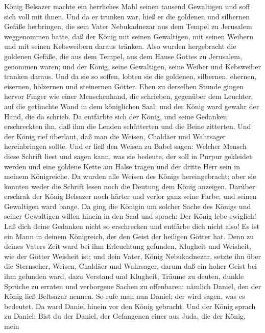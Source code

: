  König Belsazer machte ein herrliches Mahl seinen tausend
Gewaltigen und soff sich voll mit ihnen.  Und da er trunken
war, hieß er die goldenen und silbernen Gefäße herbringen, die sein
Vater Nebukadnezar aus dem Tempel zu Jerusalem weggenommen hatte, daß
der König mit seinen Gewaltigen, mit seinen Weibern und mit seinen
Kebsweibern daraus tränken.  Also wurden hergebracht die
goldenen Gefäße, die aus dem Tempel, aus dem Hause Gottes zu Jerusalem,
genommen waren; und der König, seine Gewaltigen, seine Weiber und
Kebsweiber tranken daraus.  Und da sie so soffen, lobten sie
die goldenen, silbernen, ehernen, eisernen, hölzernen und steinernen
Götter.  Eben zu derselben Stunde gingen hervor Finger wie
einer Menschenhand, die schrieben, gegenüber dem Leuchter, auf die
getünchte Wand in dem königlichen Saal; und der König ward gewahr der
Hand, die da schrieb.  Da entfärbte sich der König, und
seine Gedanken erschreckten ihn, daß ihm die Lenden schütterten und die
Beine zitterten.  Und der König rief überlaut, daß man die
Weisen, Chaldäer und Wahrsager hereinbringen sollte. Und er ließ den
Weisen zu Babel sagen: Welcher Mensch diese Schrift liest und sagen
kann, was sie bedeute, der soll in Purpur gekleidet werden und eine
goldene Kette am Halse tragen und der dritte Herr sein in meinem
Königreiche.  Da wurden alle Weisen des Königs
hereingebracht; aber sie konnten weder die Schrift lesen noch die
Deutung dem König anzeigen.  Darüber erschrak der König
Belsazer noch härter und verlor ganz seine Farbe; und seinen Gewaltigen
ward bange.  Da ging die Königin um solcher Sache des
Königs und seiner Gewaltigen willen hinein in den Saal und sprach: Der
König lebe ewiglich! Laß dich deine Gedanken nicht so erschrecken und
entfärbe dich nicht also!  Es ist ein Mann in deinem
Königreich, der den Geist der heiligen Götter hat. Denn zu deines Vaters
Zeit ward bei ihm Erleuchtung gefunden, Klugheit und Weisheit, wie der
Götter Weisheit ist; und dein Vater, König Nebukadnezar, setzte ihn über
die Sternseher, Weisen, Chaldäer und Wahrsager,  darum daß
ein hoher Geist bei ihm gefunden ward, dazu Verstand und Klugheit,
Träume zu deuten, dunkle Sprüche zu erraten und verborgene Sachen zu
offenbaren: nämlich Daniel, den der König ließ Beltsazar nennen. So rufe
man nun Daniel; der wird sagen, was es bedeutet.  Da ward
Daniel hinein vor den König gebracht. Und der König sprach zu Daniel:
Bist du der Daniel, der Gefangenen einer aus Juda, die der König, mein
